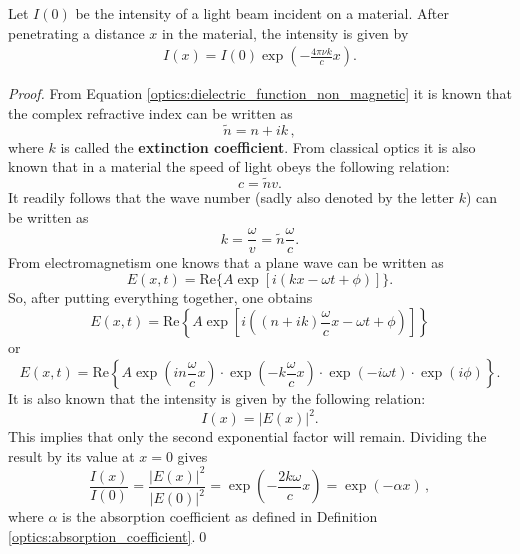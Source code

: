     \begin{theorem}\label{optics:lambert_beer}
        Let $I(0)$ be the intensity of a light beam incident on a material. After penetrating a distance $x$ in the material, the intensity is given by
        \begin{gather}
            I(x) = I(0)\exp\left(-\frac{4\pi\nu k}{c}x\right).
        \end{gather}
        \begin{mdframed}[roundcorner=10pt, linecolor=blue, linewidth=1pt]
            \begin{proof}
                From Equation \eqref{optics:dielectric_function_non_magnetic} it is known that the complex refractive index can be written as \[\widetilde{n} = n+ik\,,\] where $k$ is called the \textbf{extinction coefficient}. From classical optics it is also known that in a material the speed of light obeys the following relation: \[c = \widetilde{n}v.\] It readily follows that the wave number (sadly also denoted by the letter $k$) can be written as \[k = \frac{\omega}{v} = \widetilde{n}\frac{\omega}{c}.\] From electromagnetism one knows that a plane wave can be written as \[E(x,t) = \mathrm{Re}\big\{A\exp\left[i(kx - \omega t + \phi)\right]\big\}.\] So, after putting everything together, one obtains \[E(x,t) = \mathrm{Re}\left\{A\exp\left[i\left((n+ik)\frac{\omega}{c}x - \omega t + \phi\right)\right]\right\}\] or \[E(x,t) = \mathrm{Re}\left\{A\exp\left(in\frac{\omega}{c}x\right)\cdot\exp\left(-k\frac{\omega}{c}x\right)\cdot\exp\left(-i\omega t\right)\cdot\exp\left(i\phi\right)\right\}.\] It is also known that the intensity is given by the following relation:\[I(x) = |E(x)|^2.\] This implies that only the second exponential factor will remain. Dividing the result by its value at $x=0$ gives \[\frac{I(x)}{I(0)} = \frac{|E(x)|^2}{|E(0)|^2} = \exp\left(-\frac{2k\omega}{c}x\right) = \exp(-\alpha x)\,,\]
                where $\alpha$ is the absorption coefficient as defined in Definition \ref{optics:absorption_coefficient}.\qed
            \end{proof}
        \end{mdframed}
    \end{theorem}


